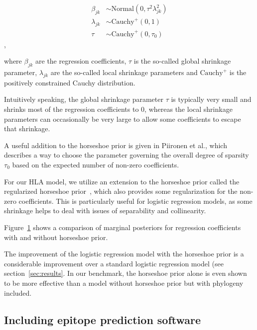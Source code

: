 \documentclass[fleqn,11pt]{SelfArx} %
\begin{document}
\begin{equation}
  \begin{aligned}
    \beta_{jk} &\sim \text{Normal}(0, \tau^{2}\lambda^{2}_{jk}) \\
    \lambda_{jk} &\sim \text{Cauchy}^{+}(0, 1) \\
    \tau &\sim \text{Cauchy}^{+}(0, \tau_{0})
  \end{aligned}
\end{equation},

where \(\beta_{jk}\) are the regression coefficients, \(\tau\) is the so-called global shrinkage parameter, \(\lambda_{jk}\) are the so-called local shrinkage parameters and \(\text{Cauchy}^{+}\) is the positively constrained Cauchy distribution.

Intuitively speaking, the global shrinkage parameter \(\tau\) is typically very small and shrinks most of the regression coefficients to 0, whereas the local shrinkage parameters can occasionally be very large to allow some coefficients to escape that shrinkage.

A useful addition to the horseshoe prior is given in Piironen et al.\cite{Piironen2017}, which describes a way to choose the parameter governing the overall degree of sparsity \(\tau_{0}\) based on the expected number of non-zero coefficients. 

For our HLA model, we utilize an extension to the horseshoe prior called the regularized horseshoe prior~\cite{Piironen2017}, which also provides some regularization for the non-zero coefficients. This is particularly useful for logistic regression models, as some shrinkage helps to deal with issues of separability and collinearity.

Figure~\ref{fig:horseshoe-comparison} shows a comparison of marginal posteriors for regression coefficients with and without horseshoe prior.

The improvement of the logistic regression model with the horseshoe prior is a considerable improvement over a standard logistic regression model (see section~\ref{sec:results}. In our benchmark, the horseshoe prior alone is even shown to be more effective than a model without horseshoe prior but with phylogeny included.

\begin{figure}
  \label{fig:horseshoe-comparison}
\end{figure}

\subsection*{Including epitope prediction software}
\end{document}
